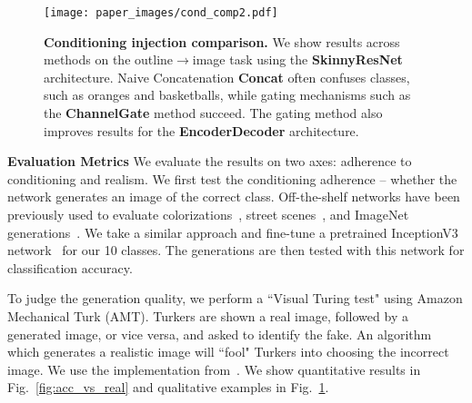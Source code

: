 
\begin{figure}[h]
    \centering
    \texttt{[image: paper\_images/cond\_comp2.pdf]}
    \caption{{\bf Conditioning injection comparison.} We show results across methods on the outline$\rightarrow$image task using the \textbf{SkinnyResNet} architecture. Naive Concatenation \textbf{Concat} often confuses classes, such as oranges and basketballs, while gating mechanisms such as the \textbf{ChannelGate} method succeed. The gating method also improves results for the \textbf{EncoderDecoder} architecture. \label{fig:alg_comp} }
    \vspace{-4mm}
\end{figure}




\vspace{2mm} \noindent \textbf{Evaluation Metrics} We evaluate the results on two axes: adherence to conditioning and realism. We first test the conditioning adherence -- whether the network generates an image of the correct class. Off-the-shelf networks have been previously used to evaluate colorizations~\cite{zhang2016colorful}, street scenes~\cite{isola2016image2image, wang2017high}, and ImageNet generations~\cite{salimans2016improved}. We take a similar approach and fine-tune a pretrained InceptionV3 network~\cite{szegedy2016rethinking} for our 10 classes. The generations are then tested with this network for classification accuracy.

To judge the generation quality, we perform a ``Visual Turing test" using Amazon Mechanical Turk (AMT). Turkers are shown a real image, followed by a generated image, or vice versa, and asked to identify the fake. An algorithm which generates a realistic image will ``fool" Turkers into choosing the incorrect image. We use the implementation from~\cite{zhang2016colorful}. We show quantitative results in Fig.~\ref{fig:acc_vs_real} and qualitative examples in Fig.~\ref{fig:alg_comp}.

